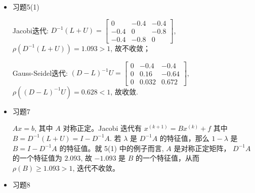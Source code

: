 \documentclass{article}
\begin{document}
\begin{spacing}{1.5}
\begin{itemize}
    \item [5.] 习题5(1)
    
    Jacobi迭代:
    $D^{-1}(L+U) = \left[\begin{array}{ccc}
        0 & -0.4 & -0.4 \\ -0.4 &   0 & -0.8 \\ -0.4 & -0.8 &   0
    \end{array}\right]$,
    $\rho(D^{-1}(L+U)) = 1.093 > 1$, 故不收敛；

    Gauss-Seidel迭代:
    $(D-L)^{-1}U =  \left[\begin{array}{ccc}
        0 & -0.4 & -0.4 \\   0 & 0.16 & -0.64 \\   0 & 0.032 & 0.672
    \end{array}\right]$,
    $\rho((D-L)^{-1}U) = 0.628 < 1$, 故收敛.

    \item [6.] 习题7
    
    $Ax = b$, 其中 $A$ 对称正定。Jacobi 迭代有 $x^{(k+1)} = Bx^{(k)} + f$ 其中 $B = D^{-1}(L+U) = I - D^{-1}A$. 若 $\lambda$ 是 $D^{-1}A$ 的特征值，那么 $1-\lambda$ 是 $B = I - D^{-1}A$ 的特征值。就 5(1) 中的例子而言, $A$ 是对称正定矩阵， $D^{-1}A$ 的一个特征值为 $2.093$, 故 $-1.093$ 是 $B$ 的一个特征值，从而 $\rho(B)\geq 1.093 > 1$, 迭代不收敛。 

    \item [7.] 习题8
    

\end{itemize}
\end{spacing}
\end{document}
